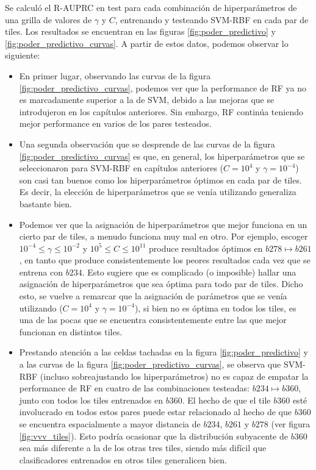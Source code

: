 Se calculó el R-AUPRC en test para cada combinación de hiperparámetros de una grilla de valores de $\gamma$ y $C$, entrenando y testeando SVM-RBF en cada par de tiles. Los resultados se encuentran en las figuras \ref{fig:poder_predictivo} y \ref{fig:poder_predictivo_curvas}. A partir de estos datos, podemos observar lo siguiente:

\begin{itemize}
\item En primer lugar, observando las curvas de la figura \ref{fig:poder_predictivo_curvas}, podemos ver que la performance de RF ya no es marcadamente superior a la de SVM, debido a las mejoras que se introdujeron en los capítulos anteriores. Sin embargo, RF continúa teniendo mejor performance en varios de los pares testeados.
\item Una segunda observación que se desprende de las curvas de la figura \ref{fig:poder_predictivo_curvas} es que, en general, los hiperparámetros que se seleccionaron para SVM-RBF en capítulos anteriores ($C=10^4$ y $\gamma=10^{-4}$) son casi tan buenos como los hiperparámetros óptimos en cada par de tiles. Es decir, la elección de hiperparámetros que se venía utilizando generaliza bastante bien.
\item Podemos ver que la asignación de hiperparámetros que mejor funciona en un cierto par de tiles, a menudo funciona muy mal en otro. Por ejemplo, escoger $ 10^{-4} \leq \gamma \leq 10^{-2}$ y $ 10^5 \leq C \leq 10^{11}$ produce resultados óptimos en $b278 \mapsto b261$, en tanto que produce consistentemente los peores resultados cada vez que se entrena con $b234$. Esto sugiere que es complicado (o imposible) hallar una asignación de hiperparámetros que sea óptima para todo par de tiles. Dicho esto, se vuelve a remarcar que la asignación de parámetros que se venía utilizando ($C=10^4$ y $\gamma=10^{-4}$), si bien no es óptima en todos los tiles, es una de las pocas que se encuentra consistentemente entre las que mejor funcionan en distintos tiles.
\item Prestando atención a las celdas tachadas en la figura \ref{fig:poder_predictivo} y a las curvas de la figura \ref{fig:poder_predictivo_curvas}, se observa que SVM-RBF (incluso sobreajustando los hiperparámetros) no es capaz de empatar la performance de RF en cuatro de las combinaciones testeadas: $b234 \mapsto b360$, junto con todos los tiles entrenados en $b360$. El hecho de que el tile  $b360$ esté involucrado en todos estos pares puede estar relacionado al hecho de que $b360$ se encuentra espacialmente a mayor distancia de $b234$, $b261$ y $b278$ (ver figura \ref{fig:vvv_tiles}). Esto podría ocasionar que la distribución subyacente de $b360$ sea más diferente a la de los otras tres tiles, siendo más difícil que clasificadores entrenados en otros tiles generalicen bien.
\end{itemize}


